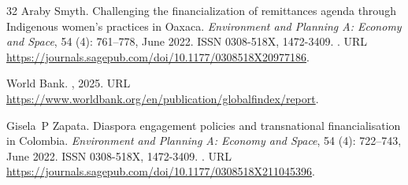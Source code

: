 \documentclass[12pt]{article}
\begin{document}
\begin{thebibliography}{32}
Araby Smyth.
\newblock Challenging the financialization of remittances agenda through {Indigenous} women’s practices in {Oaxaca}.
\newblock \emph{Environment and Planning A: Economy and Space}, 54 (4): 761--778, June 2022.
\newblock ISSN 0308-518X, 1472-3409.
\newblock {}.
\newblock URL \url{https://journals.sagepub.com/doi/10.1177/0308518X20977186}.

{World Bank}.
, 2025.
\newblock URL \url{https://www.worldbank.org/en/publication/globalfindex/report}.

Gisela~P Zapata.
\newblock Diaspora engagement policies and transnational financialisation in {Colombia}.
\newblock \emph{Environment and Planning A: Economy and Space}, 54 (4): 722--743, June 2022.
\newblock ISSN 0308-518X, 1472-3409.
\newblock {}.
\newblock URL \url{https://journals.sagepub.com/doi/10.1177/0308518X211045396}.

\end{thebibliography}

\end{document}
